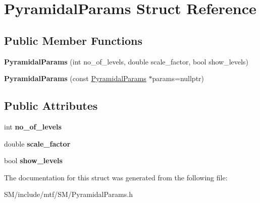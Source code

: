 \hypertarget{structPyramidalParams}{\section{Pyramidal\-Params Struct Reference}
\label{structPyramidalParams}
}
\subsection*{Public Member Functions}
\begin{DoxyCompactItemize}
\item 
\hypertarget{structPyramidalParams_a94e111cc50f4f6c2164c0fbd45e660c5}{{\bfseries Pyramidal\-Params} (int no\-\_\-of\-\_\-levels, double scale\-\_\-factor, bool show\-\_\-levels)}\label{structPyramidalParams_a94e111cc50f4f6c2164c0fbd45e660c5}

\item 
\hypertarget{structPyramidalParams_a9765787dce45f34ff9f1fabde310a4ea}{{\bfseries Pyramidal\-Params} (const \hyperlink{structPyramidalParams}{Pyramidal\-Params} $\ast$params=nullptr)}\label{structPyramidalParams_a9765787dce45f34ff9f1fabde310a4ea}

\end{DoxyCompactItemize}
\subsection*{Public Attributes}
\begin{DoxyCompactItemize}
\item 
\hypertarget{structPyramidalParams_a9d35994df00df0b45b6e844d8748a43d}{int {\bfseries no\-\_\-of\-\_\-levels}}\label{structPyramidalParams_a9d35994df00df0b45b6e844d8748a43d}

\item 
\hypertarget{structPyramidalParams_a537af30dcfc14a0e0df0200546be0afb}{double {\bfseries scale\-\_\-factor}}\label{structPyramidalParams_a537af30dcfc14a0e0df0200546be0afb}

\item 
\hypertarget{structPyramidalParams_ad97804bb05872ed5432e74702d136068}{bool {\bfseries show\-\_\-levels}}\label{structPyramidalParams_ad97804bb05872ed5432e74702d136068}

\end{DoxyCompactItemize}


The documentation for this struct was generated from the following file\-:\begin{DoxyCompactItemize}
\item 
S\-M/include/mtf/\-S\-M/Pyramidal\-Params.\-h\end{DoxyCompactItemize}
